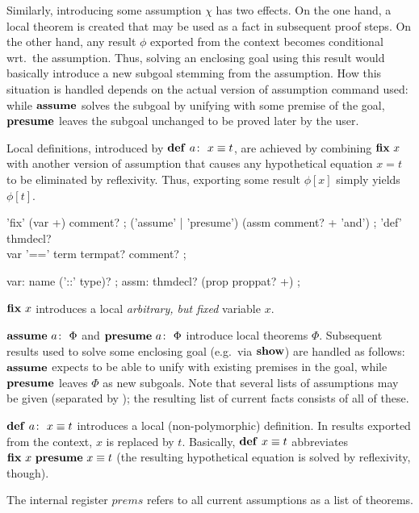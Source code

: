 Similarly, introducing some assumption $\chi$ has two effects.  On the one
hand, a local theorem is created that may be used as a fact in subsequent
proof steps.  On the other hand, any result $\phi$ exported from the context
becomes conditional wrt.\ the assumption.  Thus, solving an enclosing goal
using this result would basically introduce a new subgoal stemming from the
assumption.  How this situation is handled depends on the actual version of
assumption command used: while ${\mathord{\mathbf{assume}}}$ solves the subgoal by unifying
with some premise of the goal, ${\mathord{\mathbf{presume}}}$ leaves the subgoal unchanged to
be proved later by the user.

Local definitions, introduced by $\DEF{a}{x \equiv t}$, are achieved by
combining ${\mathord{\mathbf{fix}}}~x$ with another version of assumption that causes any
hypothetical equation $x = t$ to be eliminated by reflexivity.  Thus,
exporting some result $\phi[x]$ simply yields $\phi[t]$.

\begin{rail}
  'fix' (var +) comment?
  ;
  ('assume' | 'presume') (assm comment? + 'and')
  ;
  'def' thmdecl? \\ var '==' term termpat? comment?
  ;

  var: name ('::' type)?
  ;
  assm: thmdecl? (prop proppat? +)
  ;
\end{rail}

\begin{descr}
\item [${\mathord{\mathbf{fix}}}~x$] introduces a local \emph{arbitrary, but fixed} variable $x$.
\item [$\ASSUME{a}{\Phi}$ and $\PRESUME{a}{\Phi}$] introduce local theorems
  $\Phi$.  Subsequent results used to solve some enclosing goal (e.g.\ via
  ${\mathord{\mathbf{show}}}$) are handled as follows: ${\mathord{\mathbf{assume}}}$ expects to be able to
  unify with existing premises in the goal, while ${\mathord{\mathbf{presume}}}$ leaves $\Phi$
  as new subgoals.  Note that several lists of assumptions may be given
  (separated by ); the resulting list of current facts consists
  of all of these.
\item [$\DEF{a}{x \equiv t}$] introduces a local (non-polymorphic) definition.
  In results exported from the context, $x$ is replaced by $t$.  Basically,
  $\DEF{}{x \equiv t}$ abbreviates $\FIX{x}~\PRESUME{}{x \equiv t}$ (the
  resulting hypothetical equation is solved by reflexivity, though).
\end{descr}

The internal register $prems$ refers to all current
assumptions as a list of theorems.


